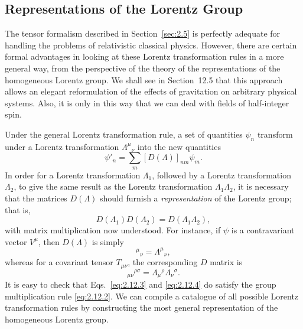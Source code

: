 
\subsection{Representations of the Lorentz Group\optionalreading}
\label{sec:2.12}
\begingroup
\renewcommand\thefootnote{*}
\endgroup

The tensor formalism described in Section~\ref{sec:2.5} is perfectly adequate
for handling the problems of relativistic classical physics. However, there are
certain formal advantages in looking at these Lorentz transformation rules in a
more general way, from the perspective of the theory of the representations of
the homogeneous Lorentz group. We shall see in Section~12.5 that this approach
allows an elegant reformulation of the effects of gravitation on arbitrary
physical systems. Also, it is only in this way that we can deal with fields of
half-integer spin.

Under the general Lorentz transformation rule, a set of quantities \(\psi_n\)
transform under a Lorentz transformation \(\Lambda^\mu{}_\nu\) into the new
quantities
\begin{equation}
  \psi'_n=\sum_m[D(\Lambda)]_{nm}\psi_m .
  \tag{2.12.1}\label{eq:2.12.1}
\end{equation}
In order for a Lorentz transformation \(\Lambda_1\), followed by a Lorentz
transformation \(\Lambda_2\), to give the same result as the Lorentz
transformation \(\Lambda_1\Lambda_2\), it is necessary that the matrices
\(D(\Lambda)\) should furnish a \emph{representation} of the Lorentz group;
that is,
\begin{equation}
  D(\Lambda_1)D(\Lambda_2)=D(\Lambda_1\Lambda_2),
  \tag{2.12.2}\label{eq:2.12.2}
\end{equation}
with matrix multiplication now understood. For instance, if \(\psi\) is a
contravariant vector \(V^\mu\), then \(D(\Lambda)\) is simply
\begin{equation}
  [D(\Lambda)]^\mu{}_\nu=\Lambda^\mu{}_\nu ,
  \tag{2.12.3}\label{eq:2.12.3}
\end{equation}
whereas for a covariant tensor \(T_{\mu\nu}\), the corresponding \(D\) matrix
is
\begin{equation}
  [D(\Lambda)]_{\mu\nu}{}^{\rho\sigma}
  =\Lambda_\mu{}^\rho\Lambda_\nu{}^\sigma .
  \tag{2.12.4}\label{eq:2.12.4}
\end{equation}
It is easy to check that Eqs.~\eqref{eq:2.12.3} and \eqref{eq:2.12.4} do
satisfy the group multiplication rule \eqref{eq:2.12.2}. We can compile a
catalogue of all possible Lorentz transformation rules by constructing the most
general representation of the homogeneous Lorentz group.

